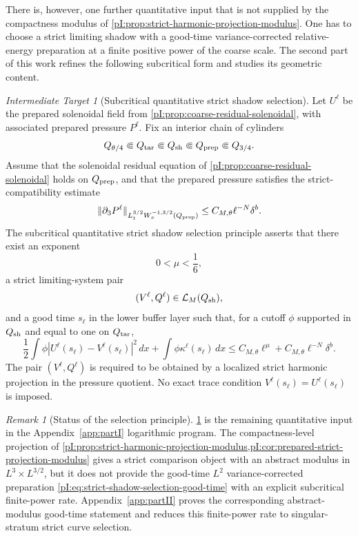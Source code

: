 \documentclass[11pt]{article}
\numberwithin{equation}{section}
\theoremstyle{plain}
\theoremstyle{definition}
\theoremstyle{remark}
\newtheorem{target}{Intermediate Target}[section]
\newtheorem{remark}{Remark}[section]
\newcommand{\calL}{\mathcal L}
\begin{document}
There is, however, one further quantitative input that is not supplied by the compactness modulus of \cref{pI:prop:strict-harmonic-projection-modulus}.  One has to choose a strict limiting shadow with a good-time variance-corrected relative-energy preparation at a finite positive power of the coarse scale.  The second part of this work refines the following subcritical form and studies its geometric content.

\begin{target}[Subcritical quantitative strict shadow selection]\label{pI:ass:strict-shadow-selection}
Let \(U^\ell\) be the prepared solenoidal field from \cref{pI:prop:coarse-residual-solenoidal}, with associated prepared pressure \(P^\ell\).  Fix an interior chain of cylinders
\[
        Q_{\theta/4}\Subset Q_{\rm tar}\Subset Q_{\rm sh}\Subset Q_{\rm prep}\Subset Q_{3/4}.
\]
Assume that the solenoidal residual equation of \cref{pI:prop:coarse-residual-solenoidal} holds on \(Q_{\rm prep}\), and that the prepared pressure satisfies the strict-compatibility estimate
\begin{equation}\label{pI:eq:quantitative-strict-compatibility-defect}
        \|\partial_3P^\ell\|_{L^{3/2}_tW^{-1,3/2}_x(Q_{\rm prep})}
        \le C_{M,\theta}\ell^{-N}\delta^b .
\end{equation}
The subcritical quantitative strict shadow selection principle asserts that there exist an exponent
\[
        0<\mu<\frac16,
\]
a strict limiting-system pair
\[
        (V^\ell,Q^\ell)\in \calL_M(Q_{\rm sh}),
\]
and a good time \(s_\ell\) in the lower buffer layer such that, for a cutoff \(\phi\) supported in \(Q_{\rm sh}\) and equal to one on \(Q_{\rm tar}\),
\begin{equation}\label{pI:eq:strict-shadow-selection-good-time}
        \frac12\int \phi |U^\ell(s_\ell)-V^\ell(s_\ell)|^2\,dx
        +\int \phi\kappa^\ell(s_\ell)\,dx
        \le C_{M,\theta}\ell^\mu+C_{M,\theta}\ell^{-N}\delta^b .
\end{equation}
The pair \((V^\ell,Q^\ell)\) is required to be obtained by a localized strict harmonic projection in the pressure quotient.  No exact trace condition \(V^\ell(s_\ell)=U^\ell(s_\ell)\) is imposed.
\end{target}

\begin{remark}[Status of the selection principle]\label{pI:rem:selection-principle-status}
\cref{pI:ass:strict-shadow-selection} is the remaining quantitative input in the Appendix~\ref{app:partI} logarithmic program.  The compactness-level projection of \cref{pI:prop:strict-harmonic-projection-modulus,pI:cor:prepared-strict-projection-modulus} gives a strict comparison object with an abstract modulus in \(L^3\times L^{3/2}\), but it does not provide the good-time \(L^2\) variance-corrected preparation \eqref{pI:eq:strict-shadow-selection-good-time} with an explicit subcritical finite-power rate.  Appendix~\ref{app:partII} proves the corresponding abstract-modulus good-time statement and reduces this finite-power rate to singular-stratum strict curve selection.
\end{remark}
\end{document}

